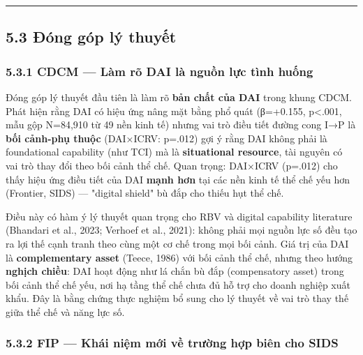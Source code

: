 \documentclass[12pt,a4paper]{article}
\begin{document}
\begin{center}\rule{0.5\linewidth}{0.5pt}\end{center}

\hypertarget{53-ux111uxf3ng-guxf3p-luxfd-thuyux1ebft}{%
\subsection{5.3 Đóng góp lý
thuyết}\label{53-ux111uxf3ng-guxf3p-luxfd-thuyux1ebft}}

\hypertarget{531-cdcm--luxe0m-ruxf5-dai-luxe0-nguux1ed3n-lux1ef1c-tuxecnh-huux1ed1ng}{%
\subsubsection{5.3.1 CDCM --- Làm rõ DAI là nguồn lực tình
huống}\label{531-cdcm--luxe0m-ruxf5-dai-luxe0-nguux1ed3n-lux1ef1c-tuxecnh-huux1ed1ng}}

Đóng góp lý thuyết đầu tiên là làm rõ \textbf{bản chất của DAI} trong
khung CDCM. Phát hiện rằng DAI có hiệu ứng nâng mặt bằng phổ quát
(β=+0.155, p\textless.001, mẫu gộp N=84,910 từ 49 nền kinh tế) nhưng vai
trò điều tiết đường cong I→P là \textbf{bối cảnh-phụ thuộc} (DAI×ICRV:
p=.012) gợi ý rằng DAI không phải là foundational capability (như TCI)
mà là \textbf{situational resource}, tài nguyên có vai trò thay đổi theo
bối cảnh thể chế. Quan trọng: DAI×ICRV (p=.012) cho thấy hiệu ứng điều
tiết của DAI \textbf{mạnh hơn} tại các nền kinh tế thể chế yếu hơn
(Frontier, SIDS) --- "digital shield" bù đắp cho thiếu hụt thể chế.

Điều này có hàm ý lý thuyết quan trọng cho RBV và digital capability
literature (Bhandari et al., 2023; Verhoef et al., 2021): không phải mọi
nguồn lực số đều tạo ra lợi thế cạnh tranh theo cùng một cơ chế trong
mọi bối cảnh. Giá trị của DAI là \textbf{complementary asset} (Teece,
1986) với bối cảnh thể chế, nhưng theo hướng \textbf{nghịch chiều}: DAI
hoạt động như lá chắn bù đắp (compensatory asset) trong bối cảnh thể chế
yếu, nơi hạ tầng thể chế chưa đủ hỗ trợ cho doanh nghiệp xuất khẩu. Đây
là bằng chứng thực nghiệm bổ sung cho lý thuyết về vai trò thay thế giữa
thể chế và năng lực số.

\hypertarget{532-fip--khuxe1i-niux1ec7m-mux1edbi-vux1ec1-trux1b0ux1eddng-hux1ee3p-biuxean-cho-sids}{%
\subsubsection{5.3.2 FIP --- Khái niệm mới về trường hợp biên cho
SIDS}\label{532-fip--khuxe1i-niux1ec7m-mux1edbi-vux1ec1-trux1b0ux1eddng-hux1ee3p-biuxean-cho-sids}}
\end{document}
